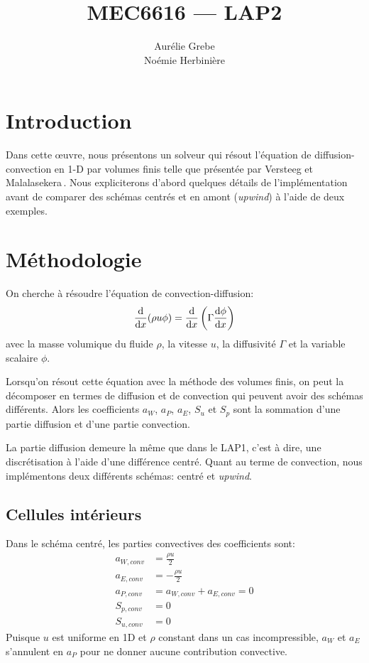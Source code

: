 \documentclass[12pt]{article}
\title{MEC6616 --- LAP2}
\author{Aurélie Grebe\\Noémie Herbinière}
\date{\displaydate{duedate}}
\begin{document}
\maketitle

\section{Introduction}

Dans cette œuvre, nous présentons un solveur qui résout l'équation
de diffusion-convection en 1-D par volumes finis telle que présentée par Versteeg
et Malalasekera\,\cite{versteeg_introduction_2007}. Nous expliciterons d'abord
quelques détails de l'implémentation avant de comparer des schémas centrés et en
amont (\emph{upwind}) à l'aide de deux exemples.

\section{Méthodologie}

On cherche à résoudre l'équation de convection-diffusion:
\begin{equation}
	\odv{}{x}(\rho u \phi) = \odv{}{x}\left( \Gamma\odv{\phi}{x}\right)
\end{equation}
avec la masse volumique du fluide $\rho$, la vitesse $u$, la diffusivité
$\Gamma$ et la variable scalaire $\phi$.

Lorsqu'on résout cette équation avec la méthode des volumes finis, on peut la
décomposer en termes de diffusion et de convection qui peuvent avoir des schémas
différents. Alors les coefficients $a_W$, $a_P$, $a_E$, $S_u$ et $S_p$ sont la
sommation d'une partie diffusion et d'une partie convection. 

La partie diffusion demeure la même que dans le LAP1, c'est à dire, une
discrétisation à l'aide d'une différence centré. Quant au terme de convection,
nous implémentons deux différents schémas: centré et \emph{upwind}.

\subsection{Cellules intérieurs}

Dans le schéma centré, les parties convectives des coefficients sont:
\begin{align}
	a_{W,conv} &= \frac{\rho u}{2}\\
	a_{E,conv} &= -\frac{\rho u}{2}\\
	a_{P,conv} &= a_{W,conv} + a_{E,conv} = 0 \\
	S_{p,conv} &= 0 \\
	S_{u,conv} &= 0
\end{align}
Puisque $u$ est uniforme en 1D et $\rho$ constant dans un cas incompressible, $a_W$ et $a_E$ s'annulent en $a_P$ pour ne donner aucune contribution convective.
\end{document}
